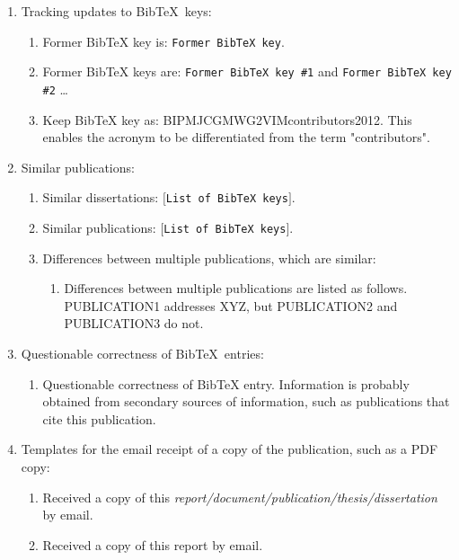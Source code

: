 \documentclass[letter,12pt]{article}
\begin{document}
\begin{enumerate}
\item Tracking updates to {\sc Bib}\TeX\ keys: \vspace{-0.3cm}
	\begin{enumerate} \itemsep -2pt
	\item Former BibTeX key is: {\tt Former BibTeX key}.
	\item Former BibTeX keys are: {\tt Former BibTeX key \#1} and {\tt Former BibTeX key \#2} \dots
	\item Keep BibTeX key as: BIPMJCGMWG2VIMcontributors2012. This enables the acronym to be differentiated from the term "contributors".
	\end{enumerate}
\item Similar publications: \vspace{-0.3cm}
	\begin{enumerate} \itemsep -2pt
	\item Similar dissertations: $[${\tt List of {\rm {\sc Bib}\TeX}\ keys}$]$.
	\item Similar publications: $[${\tt List of {\rm {\sc Bib}\TeX}\ keys}$]$.
	\item Differences between multiple publications, which are similar: \vspace{-0.2cm}
		\begin{enumerate} \itemsep -2pt
		\item Differences between multiple publications are listed as follows. PUBLICATION1 addresses XYZ, but PUBLICATION2 and PUBLICATION3 do not.
		\end{enumerate}
	\end{enumerate}
\item Questionable correctness of {\sc Bib}\TeX\ entries: \vspace{-0.3cm}
	\begin{enumerate} \itemsep -2pt
	\item Questionable correctness of BibTeX entry. Information is probably obtained from secondary sources of information, such as publications that cite this publication.
	\end{enumerate}
\item Templates for the email receipt of a copy of the publication, such as a PDF copy: \vspace{-0.3cm}
	\begin{enumerate} \itemsep -2pt
	\item Received a copy of this {\it report/document/publication/thesis/dissertation} by email.
	\item Received a copy of this report by email.

\end{enumerate}
\end{enumerate}
\end{document}
